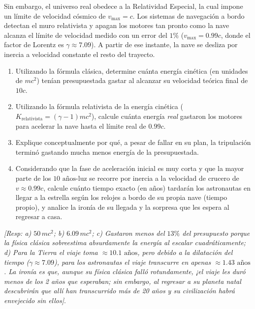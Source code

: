 \documentclass[11pt,a4paper]{book}
\begin{document}
\begin{enumerate}
    Sin embargo, el universo real obedece a la Relatividad Especial, la cual impone un límite de velocidad cósmico de $v_{\text{max}} = c$. Los sistemas de navegación a bordo detectan el muro relativista y apagan los motores tan pronto como la nave alcanza el límite de velocidad medido con un error del $1\%$ ($v_{\text{max}} = 0.99c$, donde el factor de Lorentz es $\gamma \approx 7.09$). A partir de ese instante, la nave se desliza por inercia a velocidad constante el resto del trayecto.
    
    \begin{enumerate}
        \item[a)] Utilizando la fórmula clásica, determine cuánta energía cinética (en unidades de $mc^2$) tenían presupuestada gastar al alcanzar su velocidad teórica final de $10c$.
        \item[b)] Utilizando la fórmula relativista de la energía cinética ($K_{\text{relativista}} = (\gamma - 1)mc^2$), calcule cuánta energía \textit{real} gastaron los motores para acelerar la nave hasta el límite real de $0.99c$.
        \item[c)] Explique conceptualmente por qué, a pesar de fallar en su plan, la tripulación terminó gastando mucha menos energía de la presupuestada.
        \item[d)] Considerando que la fase de aceleración inicial es muy corta y que la mayor parte de los $10 \text{ años-luz}$ se recorre por inercia a la velocidad de crucero de $v \approx 0.99c$, calcule cuánto tiempo exacto (en años) tardarán los astronautas en llegar a la estrella según los relojes a bordo de su propia nave (tiempo propio), y analice la ironía de su llegada y la sorpresa que les espera al regresar a casa.
    \end{enumerate}
    \textit{[Resp: a) $50 \, mc^2$; b) $6.09 \, mc^2$; c) Gastaron menos del $13\%$ del presupuesto porque la física clásica sobreestima absurdamente la energía al escalar cuadráticamente; d) Para la Tierra el viaje toma $\approx 10.1 \text{ años}$, pero debido a la dilatación del tiempo ($\gamma \approx 7.09$), para los astronautas el viaje transcurre en apenas $\approx 1.43 \text{ años}$. La ironía es que, aunque su física clásica falló rotundamente, ¡el viaje les duró menos de los 2 años que esperaban; sin embargo, al regresar a su planeta natal descubrirán que allí han transcurrido más de 20 años y su civilización habrá envejecido sin ellos]}.


\end{enumerate}
\end{document}
